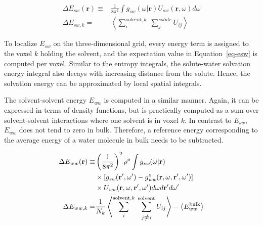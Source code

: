 \documentclass[9pt,tutorial]{livecoms}
\renewcommand{\neq}{\setbox0\hbox{=}\rlap{\hbox to \wd0{\hss /\hss}}\box0}
\begin{document}
\begin{equation}
	\begin{aligned}
		\label{eq-esw}
		\Delta E_{sw}(\textbf{r}) \equiv& \frac{1}{8\pi^2} \int g_\textit{sw}\left(\omega|\textbf{r}\right) U_\textit{sw}\left(\textbf{r}, \omega\right) d\omega \\
		\Delta E_{sw,k}=& \left\langle \sum_i^{\textit{solvent},k} \; \sum_j^\textit{solute} U_{ij}\right\rangle
	\end{aligned}
\end{equation}

To localize $E_{sw}$ on the three-dimensional grid, every energy term is assigned to the voxel $k$ holding the solvent, and the expectation value in Equation~\ref{eq-esw} is computed per voxel.
Similar to the entropy integrals, the solute-water solvation energy integral also decays with increasing distance from the solute. Hence, the solvation energy can be approximated by local spatial integrals. 

The solvent-solvent energy $E_{ww}$ is computed in a similar manner.
Again, it can be expressed in terms of density functions, but is practically computed as a sum over solvent-solvent interactions where one solvent is in voxel $k$.
In contrast to $E_{sw}$, $E_{ww}$ does not tend to zero in bulk.
Therefore, a reference energy corresponding to the average energy of a water molecule in bulk needs to be subtracted.


\begin{equation}
	\begin{aligned}
		\Delta E_{ww}(\textbf{r}) \equiv & \left(\frac{1}{8\pi^2} \right)^2 \rho^o \int g_\textit{sw}(\omega|\textbf{r}) \\
		& \times \left[g_\textit{sw}(\textbf{r}^\prime , \omega^\prime) - g^o_\textit{ww} (\textbf{r}, \omega, \textbf{r}^\prime, \omega^\prime )\right] \\
		& \times U_\textit{ww}(\textbf{r}, \omega, \textbf{r}^\prime, \omega^\prime)d\omega d\textbf{r}^\prime d\omega^\prime \\
		\Delta E_{ww,k} =& \frac{1}{N_k} \left\langle \sum_i^{\text{solvent},k} \; \sum_{j \neq i}^\text{solvent} U_{ij}\right\rangle - \left\langle E_{ww}^\text{bulk}\right\rangle
	\end{aligned}
\end{equation}
\end{document}

